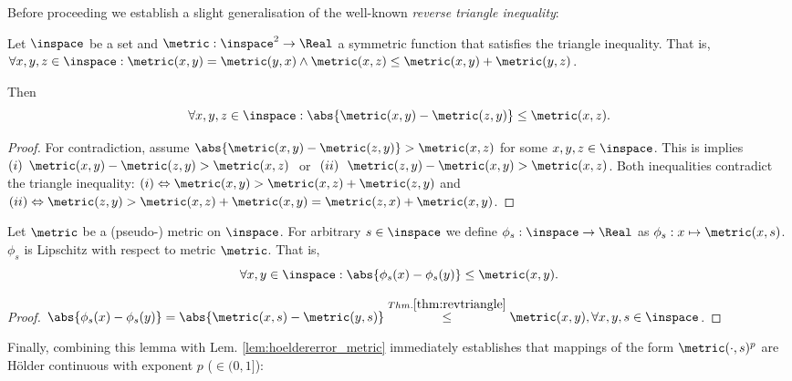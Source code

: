 Before proceeding we establish a slight generalisation of the well-known \textit{reverse triangle inequality}:

\begin{lem} \label{thm:revtriangle}
Let  $\inspace$ be a set and $\metric : \inspace^2 \to \Real$ a symmetric function that satisfies the triangle inequality. 
That is,  $\forall x,y,z \in \inspace: \metric (x,y) = \metric(y,x) \wedge \metric(x,z) \leq \metric(x,y) + \metric(y,z)$.

Then \[\forall x,y,z \in \inspace: \abs{\metric(x,y) - \metric(z,y)} \leq \metric(x,z).\]
\begin{proof}
For contradiction, assume 
$\abs{\metric(x,y) - \metric(z,y)}>\metric(x,z)$ for some $x,y,z \in \inspace$.
This is implies  
$
(i)\,\,\, \metric(x,y) - \metric(z,y)>\metric(x,z) 
\, \, $  or  $
\,\,  (ii) \,\,\,\, \metric(z,y)-\metric(x,y) >\metric(x,z)$.
Both inequalities contradict the triangle inequality:
$(i) \Leftrightarrow \metric(x,y)  >\metric(x,z) +\metric(z,y) $ and 
$(ii) \Leftrightarrow  \metric(z,y) > \metric(x,z) + \metric(x,y) =  \metric(z,x) + \metric(x,y)$.

\end{proof}
\end{lem}


\begin{lem}
Let $\metric$ be a (pseudo-) metric on $\inspace$. For arbitrary $s \in \inspace $ we define $\phi_s: \inspace \to \Real $ as $\phi_s: x \mapsto \metric (x,s) $.
$\phi_s $ is Lipschitz with respect to metric $\metric$. That is, \[\forall x,y \in \inspace : \abs{\phi_s(x) - \phi_s(y) } \leq \metric (x,y). \]
\begin{proof}
$\abs{\phi_s(x) - \phi_s(y)} = \abs{\metric(x,s) - \metric(y,s)} \stackrel{Thm. \ref{thm:revtriangle}} {\leq} \metric(x,y), \forall x,y,s \in \inspace $.
\end{proof}
\end{lem}
Finally, combining this lemma with Lem. \ref{lem:hoeldererror_metric} immediately establishes that mappings of the form $\metric(\cdot,s)^p$ are H\"older continuous with exponent $p$ ($\in (0,1]$):

